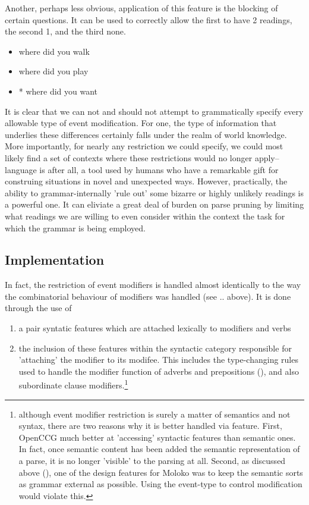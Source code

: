Another, perhaps less obvious, application of this feature is the blocking of certain questions.  It can be used to correctly allow the first to have 2 readings, the second 1, and the third none. 
\begin{itemize}
\item where did you walk
\item where did you play
\item * where did you want
\end{itemize}

It is clear that we can not and should not attempt to grammatically specify every allowable type of event modification. For one, the type of information that underlies these differences certainly falls under the realm of world knowledge. More importantly, for nearly any restriction we could specify, we could most likely find a set of contexts where these restrictions would no longer apply--language is after all, a tool used by humans who have a remarkable gift for construing situations in novel and unexpected ways. However, practically, the ability to grammar-internally 'rule out' some bizarre or highly unlikely readings is a powerful one. It can eliviate a great deal of burden on parse pruning by limiting what readings we are willing to even consider within the context the task for which the grammar is being employed.

\subsection{Implementation}	

In fact, the restriction of event modifiers is handled almost identically to the way the combinatorial behaviour of modifiers was handled (see .. above). It is done through the use of 
\begin{enumerate}
\item  a pair syntatic features which are attached lexically to modifiers and verbs
\item  the inclusion of these features within the syntactic category responsible for 'attaching' the  modifier to its modifee. This includes the type-changing rules used to handle  the modifier function of adverbs and prepositions (), and also subordinate clause modifiers.\footnote{although event modifier restriction is surely a matter of semantics and not syntax, there are two reasons why it is better handled via feature. First, OpenCCG  much better at 'accessing' syntactic features than semantic ones. In fact, once semantic content has been added the semantic representation of a parse, it is no longer 'visible' to the parsing at all. Second, as discussed above (), one of the design features for Moloko was to keep the semantic sorts as grammar external as possible. Using the event-type to control modification would violate this.}
\end{enumerate}
